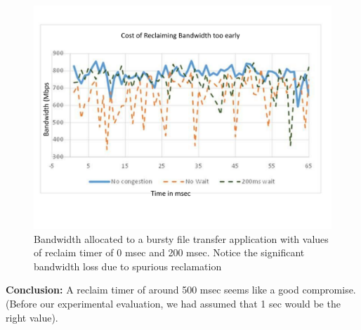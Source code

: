 \begin{figure}[h]
\centering
\includegraphics[width=\columnwidth,trim=60pt 20mm 0pt 8mm]{figures/rampdowntime2}
\caption{Bandwidth allocated to a bursty file transfer application with values of reclaim timer of 0 msec and 200 msec.  Notice the significant bandwidth loss due
to spurious reclamation}
\label{rampdowntime2}
\vspace{-3mm}
\end{figure}

{\bf Conclusion:}  A reclaim timer of around 500 msec seems like a good
compromise.  (Before our experimental evaluation, we had assumed that 1 sec
would be the right value). 
